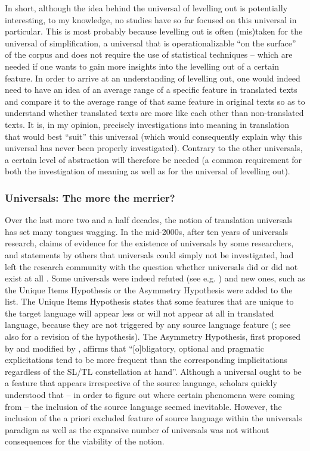 In short, although the idea behind the universal of levelling out is potentially interesting, to my knowledge, no studies have so far focused on this universal in particular. This is most probably because levelling out is often (mis)taken for the universal of simplification, a universal that is operationalizable ``on the surface'' of the corpus and does not require the use of statistical techniques -- which are needed if one wants to gain more insights into the levelling out of a certain feature. In order to arrive at an understanding of levelling out, one would indeed need to have an idea of an average range of a specific feature in translated texts and compare it to the average range of that same feature in original texts so as to understand whether translated texts are more like each other than non-translated texts. It is, in my opinion, precisely investigations into meaning in translation that would best ``suit'' this universal (which would consequently explain why this universal has never been properly investigated). Contrary to the other universals, a certain level of abstraction will therefore be needed (a common requirement for both the investigation of meaning as well as for the universal of levelling out).

\subsubsection{Universals: The more the merrier?}
\label{sec:2.2.2.5}  
Over the last more two and a half decades, the notion of translation universals has set many tongues wagging. In the mid-2000s, after ten years of universals research, claims of evidence for the existence of universals by some researchers, and statements by others that universals could simply not be investigated, had left the research community with the question whether universals did or did not exist at all \citep[1]{Mauranen2004}. Some universals were indeed refuted (see e.g. \citealt{becher_abandoning_2010}) and new ones, such as the Unique Items Hypothesis  \citep{mauranen_unique_2004} or the Asymmetry Hypothesis \citep{dimitriu_asymmetry_2009} were added to the list. The Unique Items Hypothesis states that some features that are unique to the target language will appear less or will not appear at all in translated language, because they are not triggered by any source language feature  (\citealt{mauranen_unique_2004}; see also \citealt{gambier_what_2004} for a revision of the hypothesis). The Asymmetry Hypothesis, first proposed by \citet{dimitriu_asymmetry_2009} and modified by \citet{becher_abandoning_2010}, affirms that “[o]bligatory, optional and pragmatic explicitations tend to be more frequent than the corresponding implicitations regardless of the SL\slash TL constellation at hand”. Although a universal ought to be a feature that appears irrespective of the source language, scholars quickly understood that – in order to figure out where certain phenomena were coming from – the inclusion of the source language seemed inevitable. However, the inclusion of the a priori excluded feature of source language within the universals paradigm as well as the expansive number of universals was not without consequences for the viability of the notion. 

